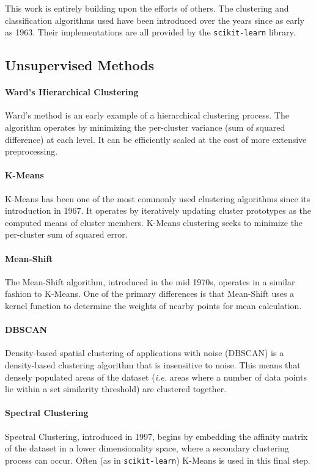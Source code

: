 \documentclass[letterpaper,10pt]{article}
\begin{document}
This work is entirely building upon the efforts of others. The clustering
and classification algorithms used have been introduced over the years
since as early as 1963. Their implementations are all provided by the
\texttt{scikit-learn} library.

\subsection{Unsupervised Methods}

\paragraph{Ward's Hierarchical Clustering} Ward's method\cite{ward1963} is
an early example of a hierarchical clustering process. The algorithm
operates by minimizing the per-cluster variance (sum of squared difference)
at each level. It can be efficiently scaled at the cost of more extensive
preprocessing.

\paragraph{K-Means} K-Means\cite{macqueen1967} has been one of the most
commonly used clustering algorithms since its introduction in 1967. It
operates by iteratively updating cluster prototypes as the computed means
of cluster members. K-Means clustering seeks to minimize the per-cluster
sum of squared error.

\paragraph{Mean-Shift} The Mean-Shift\cite{fukunaga1975} algorithm,
introduced in the mid 1970s, operates in a similar fashion to K-Means. One
of the primary differences is that Mean-Shift uses a kernel function to
determine the weights of nearby points for mean calculation.

\paragraph{DBSCAN} Density-based spatial clustering of applications with
noise (DBSCAN)\cite{ester1996} is a density-based clustering algorithm that
is insensitive to noise. This means that densely populated areas of the
dataset (\textit{i.e.} areas where a number of data points lie within a set
similarity threshold) are clustered together.

\paragraph{Spectral Clustering} Spectral Clustering\cite{shi1997},
introduced in 1997, begins by embedding the affinity matrix of the dataset
in a lower dimensionality space, where a secondary clustering process can
occur. Often (as in \texttt{scikit-learn}) K-Means is used in this final
step.
\end{document}
